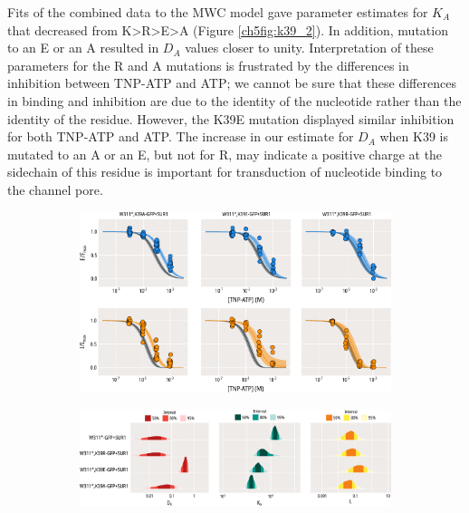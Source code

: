 Fits of the combined data to the MWC model gave parameter estimates for $K_A$ that decreased from K>R>E>A (Figure \ref{ch5fig:k39_2}).
In addition, mutation to an E or an A resulted in $D_A$ values closer to unity.
Interpretation of these parameters for the R and A mutations is frustrated by the differences in inhibition between TNP-ATP and ATP; we cannot be sure that these differences in binding and inhibition are due to the identity of the nucleotide rather than the identity of the residue.
However, the K39E mutation displayed similar inhibition for both TNP-ATP and ATP.
The increase in our estimate for $D_A$ when K39 is mutated to an A or an E, but not for R, may indicate a positive charge at the sidechain of this residue is important for transduction of nucleotide binding to the channel pore.

\begin{figure}[h]
	\centering
	\begin{subfigure}[t]{0.9\textwidth}
		\caption{}\label{ch5fig:mwc_k39_1}
		\centering
		\includegraphics[width=\textwidth]{mwc_k39_1.pdf}
	\end{subfigure}
	\vfill
	\begin{subfigure}[t]{0.9\textwidth}
		\caption{}\label{ch5fig:mwc_k39_2}
		\centering
		\includegraphics[width=\textwidth]{mwc_k39_2.pdf}
	\end{subfigure}
	\caption[K39 mutations affect gating and nucleotide binding]{
}
\end{figure}
